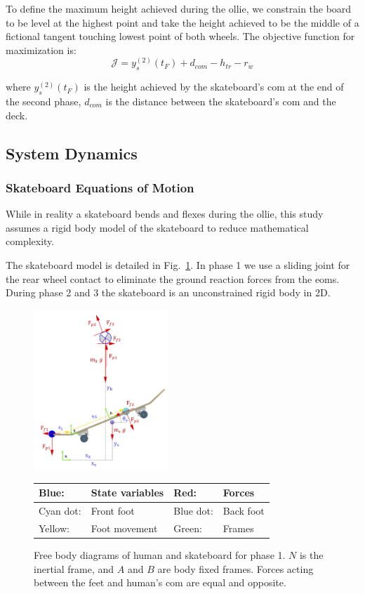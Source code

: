 \documentclass[default,iicol]{sn-jnl}
\begin{document}
To  define the maximum height achieved during the ollie, we constrain the board to be level at the highest point and
take the height achieved to be the middle of a fictional tangent touching lowest point of both wheels. The objective function for maximization is:
%
\begin{equation}
  \mathcal{J} = y_s^{(2)}(t_F) + d_{com} - h_{tr} - r_w
\end{equation}

\noindent where $y_s^{(2)}(t_F)$ is the height achieved by the skateboard's \gls{com} at the end of the second phase, $d_{com}$ is the distance between the skateboard's \gls{com} and the deck.

\subsection{System Dynamics}\label{s_systemdynamics}

\subsubsection{Skateboard Equations of Motion}
While in reality a skateboard bends and flexes during the ollie, this study assumes a rigid body model of the skateboard to reduce mathematical complexity.

The skateboard model is detailed in Fig.~\ref{fig:FBD}. In phase 1 we use a sliding joint for the rear wheel contact to eliminate the ground reaction forces from the \glspl{eom}.
During phase 2 and 3 the skateboard is an unconstrained rigid body in 2D. 

\begin{figure}
    \centering
    \includegraphics[width=0.45\textwidth]{figure/FBD_skater_feet.png}
    \footnotesize\begin{tabular}{|l l|l l|} \hline
    \color{blue}Blue: & State variables &\color{red} Red: & Forces \\ \hline
    \color{cyan}Cyan dot: & Front foot & \color{blue}Blue dot: & Back foot \\ \hline
    \color{yellow}Yellow: & Foot movement & \color{green}Green: & Frames \\ \hline
    \end{tabular}
    \caption[Free Body Diagrams phase 2 and 3]{Free body diagrams of human and skateboard for phase 1. $N$ is the inertial frame, and $A$ and $B$ are body fixed frames. Forces acting between the feet and human's \gls{com} are equal and opposite.}
    \label{fig:FBD}
\end{figure}
\end{document}
